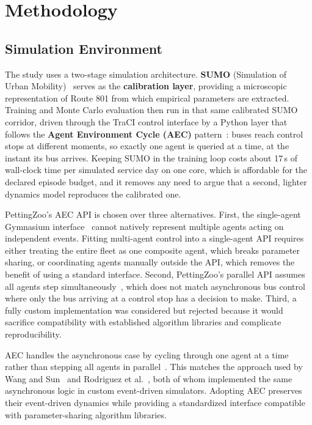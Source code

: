 \section{Methodology}

\subsection{Simulation Environment}

The study uses a two-stage simulation architecture. \textbf{SUMO} (Simulation of Urban Mobility)~\cite{Lopez2018SUMO} serves as the \textbf{calibration layer}, providing a microscopic representation of Route 801 from which empirical parameters are extracted. Training and Monte Carlo evaluation then run in that same calibrated SUMO corridor, driven through the TraCI control interface by a Python layer that follows the \textbf{Agent Environment Cycle (AEC)} pattern~\cite{Terry2021PettingZoo}: buses reach control stops at different moments, so exactly one agent is queried at a time, at the instant its bus arrives. Keeping SUMO in the training loop costs about 17\,s of wall-clock time per simulated service day on one core, which is affordable for the declared episode budget, and it removes any need to argue that a second, lighter dynamics model reproduces the calibrated one.

PettingZoo's AEC API is chosen over three alternatives. First, the single-agent Gymnasium interface~\cite{Towers2024Gymnasium} cannot natively represent multiple agents acting on independent events. Fitting multi-agent control into a single-agent API requires either treating the entire fleet as one composite agent, which breaks parameter sharing, or coordinating agents manually outside the API, which removes the benefit of using a standard interface. Second, PettingZoo's parallel API assumes all agents step simultaneously~\cite{Terry2021PettingZoo}, which does not match asynchronous bus control where only the bus arriving at a control stop has a decision to make. Third, a fully custom implementation was considered but rejected because it would sacrifice compatibility with established algorithm libraries and complicate reproducibility. 

AEC handles the asynchronous case by cycling through one agent at a time rather than stepping all agents in parallel~\cite{Terry2021PettingZoo}. This matches the approach used by Wang and Sun~\cite{Wangsun} and Rodriguez et al.~\cite{Rodriguez2023Cooperative}, both of whom implemented the same asynchronous logic in custom event-driven simulators. Adopting AEC preserves their event-driven dynamics while providing a standardized interface compatible with parameter-sharing algorithm libraries.

